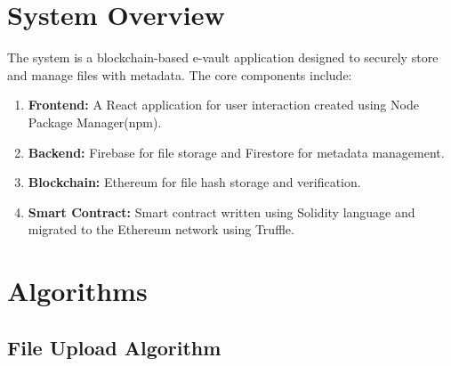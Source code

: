 \documentclass[12pt,a4paper]{report}
\begin{document}
\section{System Overview}
\par
The system is a blockchain-based e-vault application designed to securely store and manage files with metadata. The core components include:
\begin{enumerate}
   \item \textbf{Frontend:} A React application\cite{reactdocs} for user interaction created using Node Package Manager(npm)\cite{npmdocs}.
   \item \textbf{Backend:} Firebase\cite{firebasedocs} for file storage and Firestore for metadata management.
   \item \textbf{Blockchain:} Ethereum\cite{ethereumdocs} for file hash storage and verification.
   \item \textbf{Smart Contract:} Smart contract written using Solidity language\cite{soliditydocs} and migrated to the Ethereum network\cite{ethereumdocs} using Truffle\cite{truffledocs}. 
\end{enumerate}

\section{Algorithms}
\subsection{File Upload Algorithm}



\end{document}

